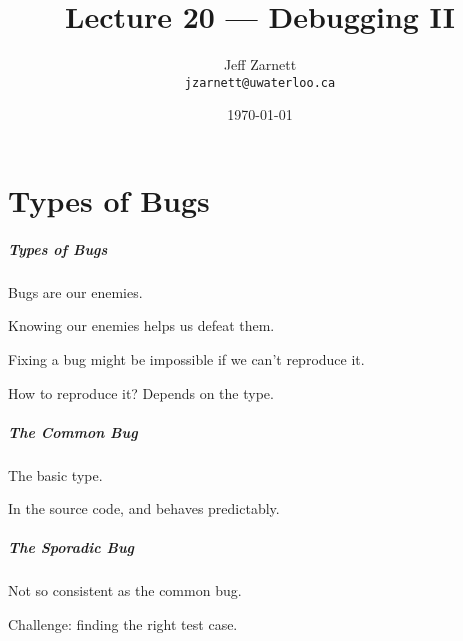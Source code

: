 
\usepackage{alltt}

\title{Lecture 20 --- Debugging II }

\author{Jeff Zarnett \\ \small \texttt{jzarnett@uwaterloo.ca}}
\date{\today}



\begin{frame}
  \titlepage

\end{frame}


\part{Types of Bugs}
\frame{\partpage}


\begin{frame}
\frametitle{Types of Bugs}
\begin{changemargin}{1cm}
Bugs are our enemies.

Knowing our enemies helps us defeat them.

Fixing a bug might be impossible if we can't \alert{reproduce} it.

How to reproduce it? Depends on the type.
\end{changemargin}
\end{frame}

\begin{frame}
\frametitle{The Common Bug}
\begin{changemargin}{1cm}
The basic type.

In the source code, and behaves predictably.

\end{changemargin}
\end{frame}

\begin{frame}
\frametitle{The Sporadic Bug}
\begin{changemargin}{1cm}
Not so consistent as the common bug. 

Challenge: finding the right test case.


\end{changemargin}
\end{frame}

